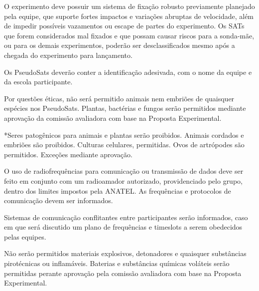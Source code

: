     \begin{definition}[3]
    O experimento deve possuir um sistema de fixação robusto previamente planejado pela equipe, que suporte fortes impactos e variações abruptas de velocidade, além de impedir possíveis vazamentos ou escape de partes do experimento. Os SATs que forem considerados mal fixados e que possam causar riscos para a sonda-mãe, ou para os demais experimentos, poderão ser desclassificados mesmo após a chegada do experimento para lançamento.
    \end{definition}
    
    \begin{definition}[4]
    Os PseudoSats deverão conter a identificação adesivada, com o nome da equipe e da escola participante.
    \end{definition}
    
    \begin{definition}[5]
    Por questões éticas, não será permitido animais nem embriões de quaisquer espécies nos PseudoSats. Plantas, bactérias e fungos serão permitidos mediante aprovação da comissão avaliadora com base na Proposta Experimental.
    
    *Seres patogênicos para animais e plantas serão proibidos. Animais cordados e embriões são proibidos. Culturas celulares, permitidas. Ovos de artrópodes são permitidos. Exceções mediante aprovação.
    \end{definition}
    
    \begin{definition}[6]
    O uso de radiofrequências para comunicação ou transmissão de dados deve ser feito em conjunto com um radioamador autorizado, providenciado pelo grupo, dentro dos limites impostos pela ANATEL. As frequências e protocolos de comunicação devem ser informados.
    
    Sistemas de comunicação conflitantes entre participantes serão informados, caso em que será discutido um plano de frequências e timeslots a serem obedecidos pelas equipes.
    \end{definition}
    
    \begin{definition}[7]
    Não serão permitidos materiais explosivos, detonadores e quaisquer substâncias pirotécnicas ou inflamáveis. Baterias e substâncias químicas voláteis serão permitidas perante aprovação pela comissão avaliadora com base na Proposta Experimental.
    \end{definition}
    
